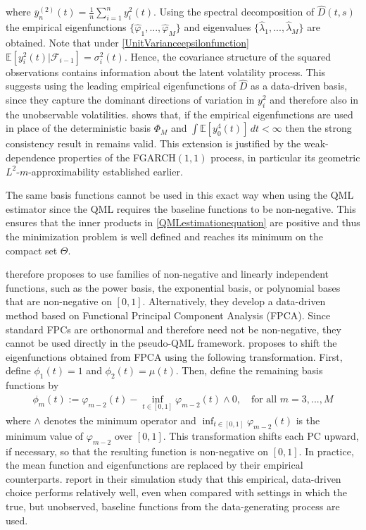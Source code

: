 \documentclass[12pt,a4paper]{article}
\theoremstyle{definition}
\begin{document}
where $\overline{y}_n^{(2)}(t)=\frac{1}{n}\sum_{i=1}^ny_i^2(t)$. Using the spectral decomposition of $\hat{D}(t,s)$ the empirical eigenfunctions $\{\hat{\varphi}_1,...,\hat{\varphi}_M\}$ and eigenvalues $\{\hat{\lambda}_1,...,\hat{\lambda}_M\}$ are obtained. Note that under \cref{UnitVarianceepsilonfunction} $\mathbb{E}[y_i^2(t)|\mathcal{F}_{i-1}]=\sigma_i^2(t)$. Hence, the covariance structure of the squared observations contains information about the latent volatility process. This suggests using the leading empirical eigenfunctions of $\hat{D}$ as a data-driven basis, since they capture the dominant directions of variation in $y_i^2$ and therefore also in the unobservable volatilities. \citet{Aue2017} shows that, if the empirical eigenfunctions are used in place of the deterministic basis $\Phi_M$ and $\int \mathbb{E}[y_0^4(t)]\,dt < \infty$ then the strong consistency result in  remains valid. This extension is justified by the weak-dependence properties of the FGARCH$(1,1)$ process, in particular its geometric $L^2$-$m$-approximability established earlier.

The same basis functions cannot be used in this exact way when using the QML estimator since the QML requires the baseline functions to be non-negative. This ensures that the inner products in \cref{QMLestimationequation} are positive and thus the minimization problem is well defined and reaches its minimum on the compact set $\Theta$.

\citet{Cerovecki2019} therefore proposes to use families of non-negative and linearly independent functions, such as the power basis, the exponential basis, or polynomial bases that are non-negative on $[0,1]$. Alternatively, they develop a data-driven method based on Functional Principal Component Analysis (FPCA). Since standard FPCs are orthonormal and therefore need not be non-negative, they cannot be used directly in the pseudo-QML framework. \citet{Cerovecki2019} proposes to shift the eigenfunctions obtained from FPCA using the following transformation. First, define $\phi_1(t)=1$ and $\phi_2(t)=\mu(t)$. Then, define the remaining basis functions by
\begin{gather}
    \phi_{m}(t) := \varphi_{m-2}(t)-\inf_{t\in[0,1]} \varphi_{m-2}(t) \wedge 0, \quad \text{for all } m=3,...,M
\end{gather}
where $\wedge$ denotes the minimum operator and $\inf_{t\in[0,1]} \varphi_{m-2}(t)$ is the minimum value of $\varphi_{m-2}$ over $[0,1]$. This transformation shifts each PC upward, if necessary, so that the resulting function is non-negative on $[0,1]$. In practice, the mean function and eigenfunctions are replaced by their empirical counterparts. \citeauthor{Cerovecki2019} report in their simulation study that this empirical, data-driven choice performs relatively well, even when compared with settings in which the true, but unobserved, baseline functions from the data-generating process are used.
\end{document}
